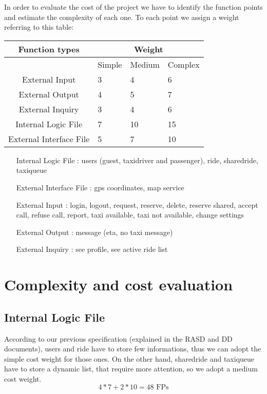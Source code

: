 In order to evaluate the cost of the project we have to identify 
the function points and estimate the complexity of each one.
To each point we assign a weight referring to this table:\\

\begin{tabular}{ | c | l | l | l |}
    \hline
     Function types & \multicolumn{3}{|c|}{Weight} \\\hline
       & Simple  & Medium & Complex \\ \hline
    External Input & 3 & 4 & 6   \\ \hline
    External Output & 4 & 5 & 7 \\ \hline
    External Inquiry & 3 & 4  & 6 \\ \hline
    Internal Logic File & 7 & 10 & 15 \\ \hline
    External Interface File & 5 & 7 & 10  \\ \hline
    \end{tabular}

\begin{itemize}
  \item [Internal Logic File]: users (guest, taxidriver and passenger), 
                               ride, sharedride, taxiqueue
  \item[External Interface File]: gps coordinates, map service
  \item[External Input]: login, logout, request, reserve, delete, reserve shared,
                         accept call, refuse call, report, taxi available,
                         taxi not available, change settings
  \item[External Output]: message (eta, no taxi message)
  \item[External Inquiry]: see profile, see active ride list
\end{itemize}


\section{Complexity and cost evaluation}
  \subsection{Internal Logic File}
  According to our previous specification (explained in the RASD and DD documents),
  users and ride have to store few informations, thus we can adopt the
  simple cost weight for those ones.
  On the other hand, sharedride and taxiqueue have to store a dynamic
  list, that require more attention, so we adopt a medium cost weight.
  \begin{equation}
   4*7 + 2*10 = 48 \text{ FPs}
  \end{equation}

